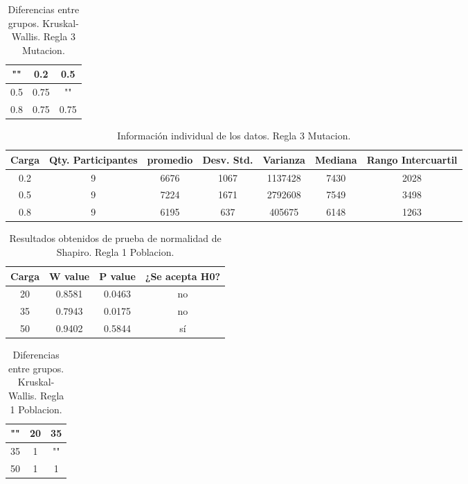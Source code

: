 \documentclass{article}
\begin{document}
\begin{table}[htb]
    \centering
    \caption{Diferencias entre grupos. Kruskal-Wallis. Regla 3 Mutacion.} 
    \begin{tabular}{|c|c|c|}
    \hline
    "" & 0.2 & 0.5 \\
    \hline
    0.5 & 0.75 & ""  \\
    \hline
    0.8 & 0.75 & 0.75  \\
    \hline
\end{tabular}
    \label{cuadro 17}
\end{table}

\begin{table}[htb]
    \centering
    \caption{Informaci\'on individual de los datos. Regla 3 Mutacion.} 
    \begin{tabular}{|c|c|c|c|c|c|c|}
    \hline
    Carga & Qty. Participantes & promedio & Desv. Std. & Varianza & Mediana & Rango Intercuartil  \\
    \hline
    0.2 & 9 & 6676 & 1067 & 1137428 & 7430 & 2028 \\
    \hline
    0.5 & 9 & 7224 & 1671 & 2792608 & 7549 & 3498 \\
    \hline
    0.8 & 9 & 6195 & 637 & 405675 & 6148 & 1263 \\
    \hline
\end{tabular}
    \label{cuadro 18}
\end{table}




\begin{table}[ht]
    \centering
    \caption{Resultados obtenidos de prueba de normalidad de Shapiro. Regla 1 Poblacion.} 
    \begin{tabular}{|c|c|c|c|}
    \hline
    Carga & W value & P value & ¿Se acepta H0?  \\
    \hline
    20 & 0.8581 & 0.0463 & no \\
    \hline 
     35 & 0.7943 & 0.0175 &  no \\
    \hline 
    50 & 0.9402 & 0.5844 & s\'i \\
    \hline 
\end{tabular}
    \label{cuadro 19}
\end{table}

\begin{table}[htb]
    \centering
    \caption{Diferencias entre grupos. Kruskal-Wallis. Regla 1 Poblacion.} 
    \begin{tabular}{|c|c|c|}
    \hline
    "" & 20 & 35 \\
    \hline
    35 & 1 & ""  \\
    \hline
    50 & 1 & 1  \\
    \hline
\end{tabular}
    \label{cuadro 20}
\end{table}
\end{document}
